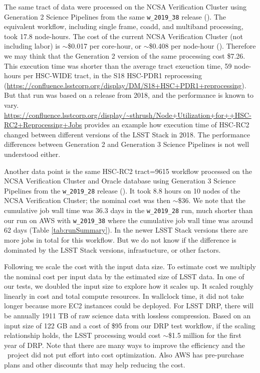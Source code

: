The same tract of data were processed on the NCSA Verification Cluster using Generation 2 Science Pipelines from the same \texttt{w\_2019\_38} release ().
The equivalent workflow, including single frame, coadd, and multiband processing, took 17.8 node-hours.
The cost of the current NCSA Verification Cluster (not including labor) is $\sim$\$0.017 per core-hour, or $\sim$\$0.408 per node-hour ().
Therefore we may think that the Generation 2 version of the same processing cost \$7.26.
This execution time was shorter than the average tract exeuction time, 59 node-hours per HSC-WIDE tract, in the S18 HSC-PDR1 reprocessing (\url{https://confluence.lsstcorp.org/display/DM/S18+HSC+PDR1+reprocessing}).
But that run was based on a release from 2018, and the performance is known to vary.
\url{https://confluence.lsstcorp.org/display/~sthrush/Node+Utilization+for++HSC-RC2+Reprocessing+Jobs} provides an example how execution time of HSC-RC2 changed between different versions of the LSST Stack in 2018.
The performance differences between Generation 2 and Generation 3 Science Pipelines is not well understood either.

Another data point is the same HSC-RC2 tract=9615 workflow processed on the NCSA Verification Cluster and Oracle database using Generation 3 Science Pipelines from the \texttt{w\_2019\_28} release ().
It took 8.8 hours on 10 nodes of the NCSA Verification Cluster; the nominal cost was then $\sim$\$36.
We note that the cumulative job wall time was 36.3 days in the \texttt{w\_2019\_28} run, much shorter than our run on AWS with \texttt{w\_2019\_38} where the cumulative job wall time was around 62 days (Table \ref{tab:runSummary}).
In the newer LSST Stack versions there are more jobs in total for this workflow.
But we do not know if the difference is dominated by the LSST Stack versions, infrastucture, or other factors.

Following  we scale the cost with the input data size.
To estimate cost we multiply the nominal cost per input data by the estimated size of LSST data.
In one of our tests, we doubled the input size to explore how it scales up.
It scaled roughly linearly in cost and total compute resources.
In wallclock time, it did not take longer because more EC2 instances could be deployed.
For LSST DRP, there will be annually 1911 TB of raw science data with lossless compression.
Based on an input size of 122 GB and a cost of \$95 from our DRP test workflow, if the scaling relationship holds, the LSST processing would cost $\sim$\$1.5 million for the first year of DRP.
Note that there are many ways to improve the efficiency and the \poc~project did not put effort into cost optimization.
Also AWS has pre-purchase plans and other discounts that may help reducing the cost.



